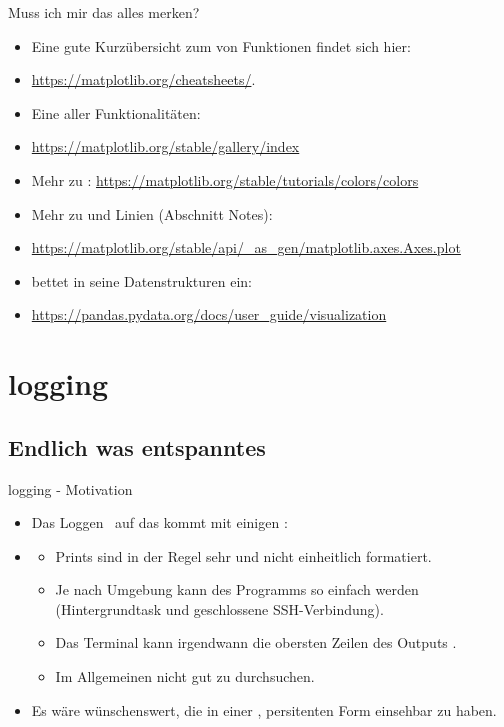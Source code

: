 \documentclass[12pt, aspectratio=169, usepdftitle=false]{beamer}
\newcommand{\pp}[1]{\lpl{#1}}
\begin{document}
\begin{frame}{Muss ich mir das alles merken?}
    \begin{itemize}
        \item Eine gute Kurzübersicht zum  von Funktionen findet sich hier:
        \item[] \url{https://matplotlib.org/cheatsheets/}.
        \item Eine  aller Funktionalitäten:
        \item[] \url{https://matplotlib.org/stable/gallery/index}
        \item Mehr zu : \url{https://matplotlib.org/stable/tutorials/colors/colors}
        \item Mehr zu  und Linien (Abschnitt \glqq Notes\grqq):
        \item[] \url{https://matplotlib.org/stable/api/_as_gen/matplotlib.axes.Axes.plot}
        \item \pp{pandas} bettet \pp{matplotlib} in seine Datenstrukturen ein: 
        \item[] \url{https://pandas.pydata.org/docs/user_guide/visualization}
    \end{itemize}
    
    
\end{frame}

\framecardfragen

\section{logging}
\subsection{Endlich was entspanntes}
\begin{frame}{logging - Motivation}
    \begin{itemize}
        \item Das \glqq Loggen\grqq~ auf das  kommt mit einigen :
        \pause
        \item[] \begin{itemize}
            \item Prints sind in der Regel sehr  und nicht einheitlich formatiert.
            \pause
            \item Je nach Umgebung kann \pp{stdout} des Programms  so einfach  werden (Hintergrundtask und geschlossene SSH-Verbindung).
            \pause
            \item Das Terminal kann irgendwann die obersten Zeilen des Outputs .
            \pause
            \item Im Allgemeinen nicht gut zu durchsuchen.
            \pause
        \end{itemize}
    \item Es wäre wünschenswert, die  in einer , persitenten Form einsehbar zu haben.
        
    \end{itemize}
\end{frame}
\end{document}
